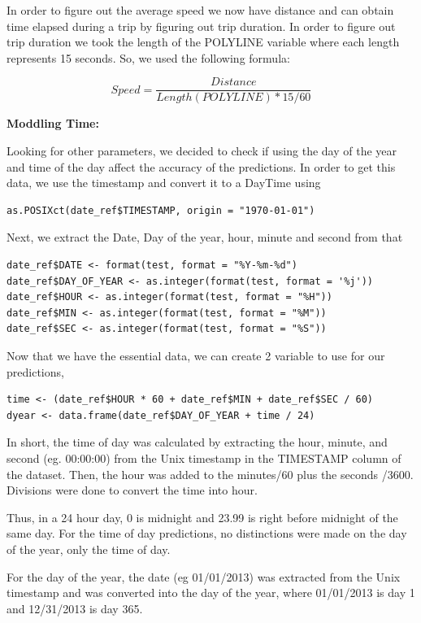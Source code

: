 \documentclass[11pt]{article}
\begin{document}
\par
In order to figure out the average speed we now have distance and can obtain time elapsed during a trip by figuring out trip duration. In order to figure out trip duration we took the length of the POLYLINE variable where each length represents 15 seconds. So, we used the following formula:

\begin{equation*}
	Speed = \frac{Distance} {Length(POLYLINE) * 15 / 60}
\end{equation*}

\textbf{Moddling Time:}
\par
Looking for other parameters, we decided to check if using the day of the year and time of the day affect the accuracy of the predictions. In order to get this data, we use the timestamp and convert it to a DayTime using

\begin{lstlisting}
as.POSIXct(date_ref$TIMESTAMP, origin = "1970-01-01")
\end{lstlisting}
\par
Next, we extract the Date, Day of the year, hour, minute and second from that
\begin{lstlisting}
date_ref$DATE <- format(test, format = "%Y-%m-%d")
date_ref$DAY_OF_YEAR <- as.integer(format(test, format = '%j'))
date_ref$HOUR <- as.integer(format(test, format = "%H"))
date_ref$MIN <- as.integer(format(test, format = "%M"))
date_ref$SEC <- as.integer(format(test, format = "%S"))
\end{lstlisting}

\par
Now that we have the essential data, we can create 2 variable to use for our predictions, 
\begin{lstlisting}
time <- (date_ref$HOUR * 60 + date_ref$MIN + date_ref$SEC / 60)
dyear <- data.frame(date_ref$DAY_OF_YEAR + time / 24)  
\end{lstlisting}

\par
In short, the time of day was calculated by extracting the hour, minute, and second (eg. 00:00:00) from the Unix timestamp in the TIMESTAMP column of the dataset. Then, the hour was added to the minutes/60 plus the seconds /3600. Divisions were done to convert the time into hour.

\par
Thus, in a 24 hour day, 0 is midnight and 23.99 is right before midnight of the same day. For the time of day predictions, no distinctions were made on the day of the year, only the time of day. 
\par
For the day of the year, the date (eg 01/01/2013) was extracted from the Unix timestamp and was converted into the day of the year, where 01/01/2013 is day 1 and 12/31/2013 is day 365. 
\end{document}
